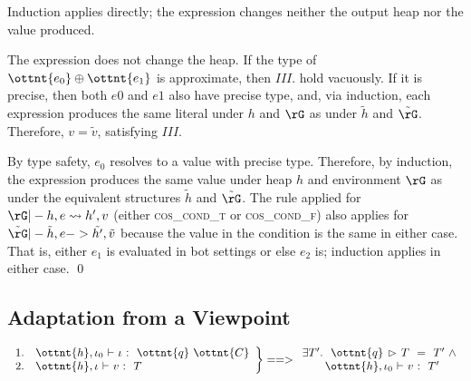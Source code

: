 
Induction applies directly; the expression changes neither the output heap nor
the value produced.


The expression does not change the heap. If the type of $\ottnt{e_{{\mathrm{0}}}}  \oplus  \ottnt{e_{{\mathrm{1}}}}$ is
approximate, then $III.$ hold vacuously. If it is precise, then both $e0$ and
$e1$ also have precise type, and, via induction, each expression produces the
same literal under $h$ and $\rG$ as under $\tilde{h}$ and $\tilde{\rG}$.
Therefore, $v = \tilde{v}$, satisfying $III.$


By type safety, $e_0$ resolves to a value with precise type. Therefore, by
induction, the expression produces the same value under heap $h$ and
environment $\rG$ as under the equivalent structures $\tilde{h}$ and
$\tilde{\rG}$. The rule applied for $\rG |- h, e \leadsto h', v$
(either \textsc{cos\_cond\_t} or \textsc{cos\_cond\_f})
also applies for 
$\tilde{\rG} |- \tilde{h}, e -> \tilde{h'}, \tilde{v}$ because the value in the
condition is the same in either case. That is, either $e_1$ is evaluated in bot
settings or else $e_2$ is; induction applies in either case.
\qed


\subsection{Adaptation from a Viewpoint}

\begin{lemma}
\label{enerj:lemma:comp}
\[
\left.
\begin{array}{ll}
1. &  \ottnt{h} ,  \iota_{{\mathrm{0}}} \  \textsf{$\vdash$} \  \iota \  \textsf{:} \ \    \ottnt{q} \  \ottnt{C}   \\
2. &  \ottnt{h} ,  \iota \  \textsf{$\vdash$} \  v \  \textsf{:} \ \  T \\
\end{array}
\right\} ==>
\begin{array}{l}
\exists T'.\ \ 
 \ottnt{q} \, \rhd\,  T \ \  \textsf{=} \ \  T' \ \wedge \\
\qquad
 \ottnt{h} ,  \iota_{{\mathrm{0}}} \  \textsf{$\vdash$} \  v \  \textsf{:} \ \  T' 
\end{array}
\]
\end{lemma}

